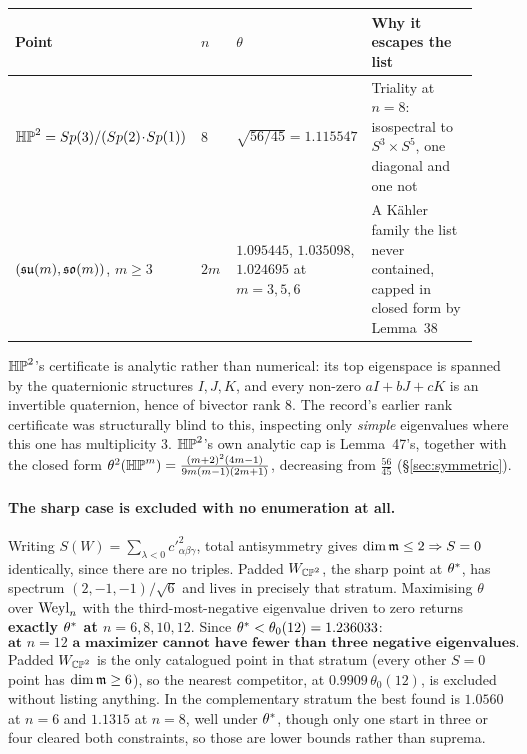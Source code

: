 \begin{longtable}{@{}p{0.30\linewidth}p{0.08\linewidth}p{0.24\linewidth}p{0.30\linewidth}@{}}
\toprule
\textbf{Point} & $n$ & $\theta$ & \textbf{Why it escapes the list} \\
\midrule
\endhead
$\mathbb{HP}^2=Sp(3)/(Sp(2)\!\cdot\!Sp(1))$ & $8$ & $\sqrt{56/45}=1.115547$ & Triality at $n=8$: isospectral to $S^3\times S^5$, one diagonal and one not \\
\addlinespace
$(\mathfrak{su}(m),\mathfrak{so}(m))$, $m\ge3$ & $2m$ & $1.095445$, $1.035098$, $1.024695$ at $m=3,5,6$ & A K\"ahler family the list never contained, capped in closed form by Lemma~38 \\
\bottomrule
\end{longtable}

$\mathbb{HP}^2$'s certificate is analytic rather than numerical: its top eigenspace is spanned by the quaternionic structures $I,J,K$, and every non-zero $aI+bJ+cK$ is an invertible quaternion, hence of bivector rank $8$. The record's earlier rank certificate was structurally blind to this, inspecting only \emph{simple} eigenvalues where this one has multiplicity $3$. $\mathbb{HP}^2$'s own analytic cap is Lemma~47's, together with the closed form $\theta^2(\mathbb{HP}^m)=\tfrac{(m+2)^2(4m-1)}{9m(m-1)(2m+1)}$, decreasing from $\tfrac{56}{45}$ (\S\ref{sec:symmetric}).

\paragraph{The sharp case is excluded with no enumeration at all.} Writing $S(W)=\sum_{\lambda<0}c'^2_{\alpha\beta\gamma}$, total antisymmetry gives $\dim\mathfrak{m}\le2\Rightarrow S=0$ identically, since there are no triples. Padded $W_{\mathbb{CP}^2}$, the sharp point at $\theta^{*}$, has spectrum $(2,-1,-1)/\sqrt6$ and lives in precisely that stratum. Maximising $\theta$ over $\mathrm{Weyl}_n$ with the third-most-negative eigenvalue driven to zero returns \textbf{exactly $\theta^{*}$ at $n=6,8,10,12$}. Since $\theta^{*}<\theta_0(12)=1.236033$:
\[
\textbf{at }n=12\textbf{ a maximizer cannot have fewer than three negative eigenvalues.}
\]
Padded $W_{\mathbb{CP}^2}$ is the only catalogued point in that stratum (every other $S=0$ point has $\dim\mathfrak{m}\ge6$), so the nearest competitor, at $0.9909\,\theta_0(12)$, is excluded without listing anything. In the complementary stratum the best found is $1.0560$ at $n=6$ and $1.1315$ at $n=8$, well under $\theta^{*}$, though only one start in three or four cleared both constraints, so those are lower bounds rather than suprema.

